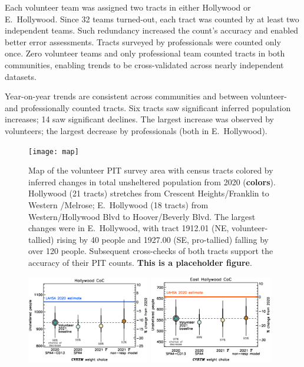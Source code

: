 \documentclass[11pt]{article}
\def\bfr{\bf\color{red}}
\begin{document}
Each volunteer team was assigned two tracts in either Hollywood or E.~Hollywood. Since 32 teams 
turned-out, each tract was counted by at least two independent teams. Such redundancy increased the 
count's accuracy and enabled better error assessments. Tracts surveyed by professionals were 
counted only once. Zero volunteer teams and only professional team counted tracts in both 
communities, enabling trends to be cross-validated across nearly independent datasets.

Year-on-year trends are consistent across communities and between volunteer- and professionally counted tracts.
Six tracts saw significant inferred population increases; 14 saw significant declines. The largest 
increase was observed by volunteers; the largest decrease by professionals (both in E.~Hollywood).\\

\begin{figure}[h]
	\centering
	\texttt{[image: map]}
	\caption{Map of the volunteer PIT survey area with census tracts colored by inferred 
			changes in total unsheltered population from 2020 ({\bfr colors}).
			Hollywood (21 tracts) stretches from Crescent Heights/Franklin to 
			Western /Melrose; E.~Hollywood (18 tracts) from Western/Hollywood 
			Blvd to Hoover/Beverly Blvd. The largest changes were in E.~Hollywood,
			with tract 1912.01 (NE, volunteer-tallied) rising by 40 people and 1927.00 
			(SE, pro-tallied) falling by over 120 people. Subsequent cross-checks of both
			tracts support the accuracy of their PIT counts. {\bfr This is a placeholder figure}.}
	\label{fig:tcomp}
\end{figure}

\begin{figure}[h]
	\centering
	\includegraphics[width = 0.48\textwidth, trim = 1cm 0cm 0cm 1cm]{hwoodFinal}
	\includegraphics[width = 0.48\textwidth, trim = 1cm 0cm 0cm 1cm]{ehoFinal}
	\caption{}
	\label{fig:wtComp}
\end{figure}
\end{document}

